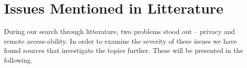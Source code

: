 \section{Issues Mentioned in Litterature}
During our search through litterature, two problems stood out -- privacy and remote access-ability.
In order to examine the severity of these issues we have found sources that investigate the topics further.
These will be presented in the following.

